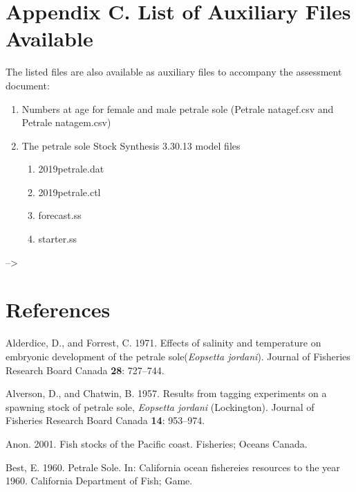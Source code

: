 \documentclass[12pt,]{article}
\begin{document}
\section{Appendix C. List of Auxiliary Files
Available}\label{appendix-c.-list-of-auxiliary-files-available}

The listed files are also available as auxiliary files to accompany the
assessment document:

\begin{enumerate}
  \item Numbers at age for female and male petrale sole (Petrale natagef.csv and Petrale natagem.csv)
  \item The petrale sole Stock Synthesis 3.30.13 model files
  
  \begin{enumerate}
    \item 2019petrale.dat
    \item 2019petrale.ctl
    \item forecast.ss
    \item starter.ss
  \end{enumerate}
\end{enumerate}

\newpage

--\textgreater{}

\color{black}

\section{References}\label{references}

\renewcommand{\thepage}{}

\hypertarget{refs}{}
\hypertarget{ref-alderdice_effects_1971}{}
Alderdice, D., and Forrest, C. 1971. Effects of salinity and temperature
on embryonic development of the petrale sole(\emph{Eopsetta jordani}).
Journal of Fisheries Research Board Canada \textbf{28}: 727--744.

\hypertarget{ref-alverson_results_1957}{}
Alverson, D., and Chatwin, B. 1957. Results from tagging experiments on
a spawning stock of petrale sole, \emph{Eopsetta jordani} (Lockington).
Journal of Fisheries Research Board Canada \textbf{14}: 953--974.

\hypertarget{ref-anon_fish_2001}{}
Anon. 2001. Fish stocks of the Pacific coast. Fisheries; Oceans Canada.

\hypertarget{ref-best_petrale_1960}{}
Best, E. 1960. Petrale Sole. In: California ocean fishereies resources
to the year 1960. California Department of Fish; Game.
\end{document}
